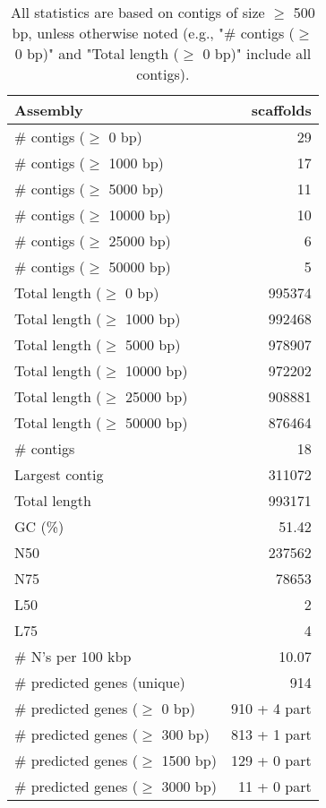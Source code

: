 \documentclass[12pt,a4paper]{article}
\begin{document}
\begin{table}[ht]
\begin{center}
\caption{All statistics are based on contigs of size $\geq$ 500 bp, unless otherwise noted (e.g., "\# contigs ($\geq$ 0 bp)" and "Total length ($\geq$ 0 bp)" include all contigs).}
\begin{tabular}{|l*{1}{|r}|}
\hline
Assembly & scaffolds \\ \hline
\# contigs ($\geq$ 0 bp) & 29 \\ \hline
\# contigs ($\geq$ 1000 bp) & 17 \\ \hline
\# contigs ($\geq$ 5000 bp) & 11 \\ \hline
\# contigs ($\geq$ 10000 bp) & 10 \\ \hline
\# contigs ($\geq$ 25000 bp) & 6 \\ \hline
\# contigs ($\geq$ 50000 bp) & 5 \\ \hline
Total length ($\geq$ 0 bp) & 995374 \\ \hline
Total length ($\geq$ 1000 bp) & 992468 \\ \hline
Total length ($\geq$ 5000 bp) & 978907 \\ \hline
Total length ($\geq$ 10000 bp) & 972202 \\ \hline
Total length ($\geq$ 25000 bp) & 908881 \\ \hline
Total length ($\geq$ 50000 bp) & 876464 \\ \hline
\# contigs & 18 \\ \hline
Largest contig & 311072 \\ \hline
Total length & 993171 \\ \hline
GC (\%) & 51.42 \\ \hline
N50 & 237562 \\ \hline
N75 & 78653 \\ \hline
L50 & 2 \\ \hline
L75 & 4 \\ \hline
\# N's per 100 kbp & 10.07 \\ \hline
\# predicted genes (unique) & 914 \\ \hline
\# predicted genes ($\geq$ 0 bp) & 910 + 4 part \\ \hline
\# predicted genes ($\geq$ 300 bp) & 813 + 1 part \\ \hline
\# predicted genes ($\geq$ 1500 bp) & 129 + 0 part \\ \hline
\# predicted genes ($\geq$ 3000 bp) & 11 + 0 part \\ \hline
\end{tabular}
\end{center}
\end{table}
\end{document}
